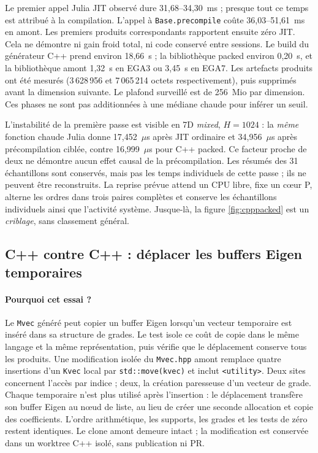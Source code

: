 \documentclass[11pt,a4paper]{article}
\newcommand{\code}[1]{\texttt{#1}}
\begin{document}
Le premier appel Julia JIT observé dure 31,68--34,30~ms ; presque tout
ce temps est attribué à la compilation. L'appel à
\code{Base.precompile} coûte 36,03--51,61~ms en amont. Les premiers
produits correspondants rapportent ensuite zéro JIT. Cela
ne démontre ni gain froid total, ni code conservé entre sessions. Le build du
générateur C++ prend environ 18,66~s ; la bibliothèque packed environ
0,20~s, et la bibliothèque amont 1,32~s en EGA3 ou 3,45~s en EGA7.
Les artefacts produits ont été mesurés (3\,628\,956 et
7\,065\,214 octets respectivement), puis supprimés avant la dimension
suivante. Le plafond surveillé est de 256~Mio par dimension. Ces phases ne sont pas additionnées
à une médiane chaude pour inférer un seuil.

L'instabilité de la première passe est visible en 7D \emph{mixed},
$H=1024$ : la \emph{même} fonction chaude Julia donne
17,452~\(\mu\)s après JIT ordinaire et 34,956~\(\mu\)s après
précompilation ciblée, contre 16,999~\(\mu\)s pour C++ packed.
Ce facteur proche de deux ne démontre aucun effet causal de la
précompilation. Les résumés des 31 échantillons sont conservés, mais pas
les temps individuels de cette passe ; ils ne peuvent être reconstruits.
La reprise prévue attend un CPU libre, fixe un cœur P,
alterne les ordres dans trois paires complètes et conserve les échantillons
individuels ainsi que l'activité système. Jusque-là, la figure
\ref{fig:cpppacked} est un \emph{criblage}, sans classement général.
\FloatBarrier

\subsection{C++ contre C++ : déplacer les buffers Eigen temporaires}
\label{sec:moveperf}
\paragraph{Pourquoi cet essai ?}
Le \code{Mvec} généré peut copier un buffer Eigen lorsqu'un vecteur
temporaire est inséré dans sa structure de grades. Le test isole ce
coût de copie dans le même langage et la même représentation, puis
vérifie que le déplacement conserve tous les produits.
Une modification isolée du \code{Mvec.hpp} amont remplace quatre insertions
d'un \code{Kvec} local par \code{std::move(kvec)} et inclut
\code{<utility>}. Deux sites concernent l'accès par indice ;
deux, la création paresseuse d'un vecteur de grade. Chaque temporaire n'est plus
utilisé après l'insertion : le déplacement transfère son buffer Eigen
au nœud de liste, au lieu de créer une seconde allocation et copie des
coefficients. L'ordre arithmétique, les supports, les grades et les tests de
zéro restent identiques. Le clone amont demeure intact ; la modification
est conservée dans un worktree C++ isolé, sans publication ni PR.
\end{document}
